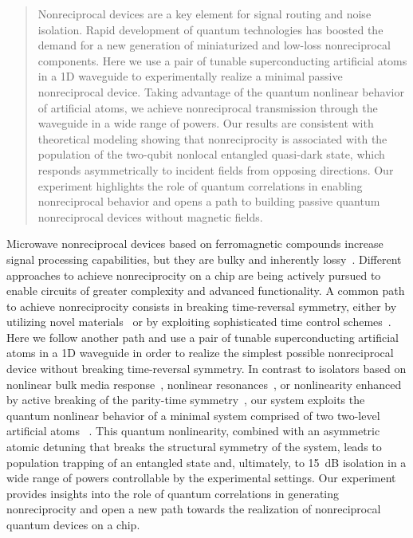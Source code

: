 \documentclass[pra, twocolumn, amsmath, amssymb, notitlepage, longbibliography, showpacs, superscriptaddress]{revtex4-1}
\begin{document}
\begin{abstract}
Nonreciprocal devices are a key element for signal routing and noise isolation.  Rapid development of quantum technologies has
boosted the demand for a new generation of miniaturized and low-loss nonreciprocal components. Here we use a  pair of tunable superconducting 
artificial atoms in a 1D waveguide  to experimentally realize a minimal passive nonreciprocal device. 
Taking advantage of the quantum nonlinear behavior of artificial atoms, we 
achieve nonreciprocal transmission through 
the waveguide in a wide range of powers. 
Our results are consistent with theoretical modeling showing that nonreciprocity is associated with
the population  of the two-qubit nonlocal entangled quasi-dark state, 
which responds asymmetrically to incident fields from opposing directions. 
Our experiment highlights the role of quantum correlations in
enabling nonreciprocal behavior and opens a path to building 
passive quantum nonreciprocal devices without magnetic fields. 
\end{abstract}

\maketitle


Microwave nonreciprocal devices based on ferromagnetic compounds increase 
signal processing capabilities, but they are bulky and inherently lossy~\cite{Pozar1998}. 
Different approaches to achieve nonreciprocity on a chip are being actively pursued to enable 
circuits of greater complexity and advanced functionality. A common path to achieve  
nonreciprocity consists in breaking time-reversal symmetry, either by utilizing  
novel materials~\cite{Viola2014,Mahoney2017,Muller2018}
or by exploiting sophisticated time control 
schemes~\cite{Estep2014,Kerckhoff2015,Barzanjeh2017, Bernier2017, Fang2017,Chapman2017}. 
Here we follow another path and use a pair of tunable superconducting artificial atoms 
in a 1D waveguide in order to realize the simplest possible nonreciprocal device 
without breaking time-reversal symmetry. 
In contrast to isolators based on nonlinear bulk media 
response~\cite{Fan2012,Yi2015}, nonlinear resonances~\cite{Sounas2018}, or nonlinearity enhanced by active breaking of the parity-time symmetry~\cite{Peng2014},
our system exploits the quantum nonlinear behavior of a minimal system comprised of two 
two-level artificial atoms ~\cite{Fratini2014,Dai2015,Fratini2016,Muller2017a}. 
This quantum nonlinearity, combined with an asymmetric atomic detuning
that breaks the structural symmetry of the system, leads to population trapping 
of an entangled state and, ultimately, to 15~dB isolation 
in a wide range of powers controllable by the experimental settings. 
Our experiment provides insights into the role of quantum correlations in generating 
nonreciprocity and open a new path towards the realization of nonreciprocal quantum 
devices on a chip.
\end{document}
